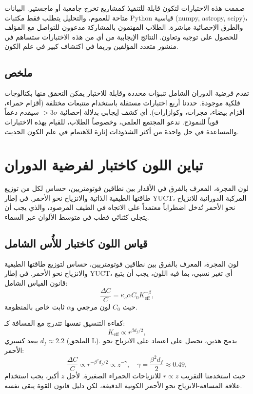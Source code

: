 \documentclass[12pt,a4paper]{article}
\begin{document}
	صممت هذه الاختبارات لتكون قابلة للتنفيذ كمشاريع تخرج جامعية أو ماجستير. البيانات متاحة للعموم، والتحليل يتطلب فقط مكتبات Python قياسية (numpy, astropy, scipy)، والطرق الإحصائية مباشرة. الطلاب المهتمون بالمشاركة مدعوون للتواصل مع المؤلف للحصول على توجيه وتعاون. النتائج الإيجابية من أي من هذه الاختبارات ستساهم في منشور متعدد المؤلفين وربما في اكتشاف كبير في علم الكون.
	
	\subsection{ملخص}
	
	تقدم فرضية الدوران الشامل تنبؤات محددة وقابلة للاختبار يمكن التحقق منها بكتالوجات فلكية موجودة. حددنا أربع اختبارات مستقلة باستخدام متتبعات مختلفة (أقزام حمراء، أقزام بيضاء، مجرات، وكوازارات). أي كشف إيجابي بدلالة إحصائية \(>3\sigma\) سيقدم دعماً قوياً للنموذج. ندعو المجتمع العلمي، وخصوصاً الطلاب، للقيام بهذه الاختبارات والمساعدة في حل واحدة من أكثر الشذوذات إثارة للاهتمام في علم الكون الحديث.
	
	\section{تباين اللون كاختبار لفرضية الدوران}
	
	لون المجرة، المعرف بالفرق في الأقدار بين نطاقين فوتومتريين، حساس لكل من توزيع طاقتها الطيفية الذاتية والانزياح نحو الأحمر. في إطار YUCT، المركبة الدورانية للانزياح نحو الأحمر تُدخل اضطراباً معتمداً على الاتجاه في الطيف المرصود، والذي يجب أن يتجلى كثنائي قطب في متوسط الألوان عبر السماء.
	
	\subsection{قياس اللون كاختبار للأُس الشامل}
	
	لون المجرة، المعرف بالفرق بين نطاقين فوتومتريين، حساس لتوزيع طاقتها الطيفية والانزياح نحو الأحمر. في إطار YUCT، أي تغير نسبي، بما فيه اللون، يجب أن يتبع قانون القياس الشامل:
	\begin{equation}
		\frac{\Delta C}{C} = \kappa_c \alpha C_0 K_{\mathrm{eff}}^{-\beta},
	\end{equation}
	حيث \(C_0\) لون مرجعي و\(\alpha\) ثابت خاص بالمنظومة.
	
	كفاءة التنسيق نفسها تتدرج مع المسافة كـ:
	\begin{equation}
		K_{\mathrm{eff}} \propto r^{\beta d_f / 2},
	\end{equation}
	ببعد كسيري \(d_f \approx 2.2\) (الملحق L). بدمج هذين، نحصل على اعتماد على الانزياح نحو الأحمر:
	\begin{equation}
		\frac{\Delta C}{C} \propto r^{-\beta^2 d_f / 2} \propto z^{-\gamma}, \quad \gamma = \frac{\beta^2 d_f}{2} \approx 0.49,
	\end{equation}
	حيث استخدمنا التقريب \(r \propto z\) للانزياحات الحمراء الصغيرة. لأجل \(z\) أكبر، يجب استخدام علاقة المسافة-الانزياح نحو الأحمر الكونية الدقيقة، لكن دليل قانون القوة يبقى نفسه.
	
\end{document}

